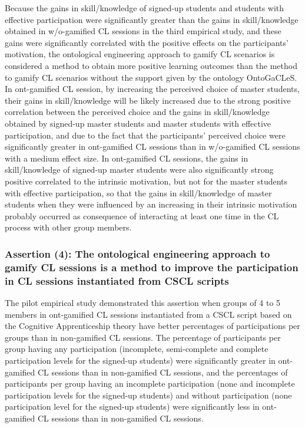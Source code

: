 Because the gains in skill/knowledge of signed-up students and students with effective participation were significantly greater than the gains in skill/knowledge obtained in w/o-gamified CL sessions in the third empirical study, and these gains were significantly correlated with the positive effects on the participants' motivation, the ontological engineering approach to gamify CL scenarios is considered a method to obtain more positive learning outcomes than the method to gamify CL scenarios without the support given by the ontology OntoGaCLeS. In ont-gamified CL session, by increasing the perceived choice of master students, their gains in skill/knowledge will be likely increased due to the strong positive correlation between the perceived choice and the gains in skill/knowledge obtained by signed-up master students and master students with effective participation, and due to the fact that the participants' perceived choice were significantly greater in ont-gamified CL sessions than in w/o-gamified CL sessions with a medium effect size. In ont-gamified CL sessions, the gains in skill/knowledge of signed-up master students were also significantly strong positive correlated to the intrinsic motivation, but not for the master students with effective participation, so that the gains in skill/knowledge of master students when they were influenced by an increasing in their intrinsic motivation probably occurred as consequence of interacting at least one time in the CL process with other group members.

\subsubsection*{Assertion (4): The ontological engineering approach to gamify CL sessions is a method to improve the participation in CL sessions instantiated from CSCL scripts}

The pilot empirical study demonstrated this assertion when groups of 4 to 5 members in ont-gamified CL sessions instantiated from a CSCL script based on the Cognitive Apprenticeship theory have better percentages of participations per groups than in non-gamified CL sessions. The percentage of participants per group having any participation (incomplete, semi-complete and complete participation levels  for the signed-up students) were significantly greater in ont-gamified CL sessions than in non-gamified CL sessions, and the percentages of participants per group having an incomplete participation (none and incomplete participation levels for the signed-up students) and without participation (none participation level for the signed-up students) were significantly less in ont-gamified CL sessions than in non-gamified CL sessions.

